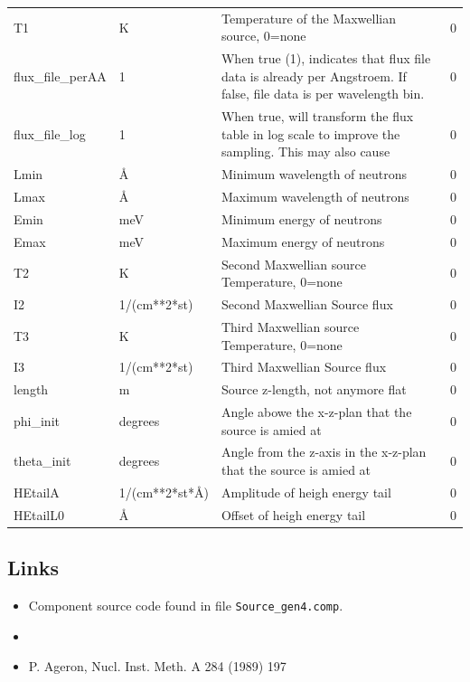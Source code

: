 \begin{longtable}{p{}p{}p{}p{}}
T1 & K & Temperature of the Maxwellian source, 0=none & 0 \\
flux\_file\_perAA & 1 & When true (1), indicates that flux file data is already per Angstroem. If false, file data is per wavelength bin. & 0 \\
flux\_file\_log & 1 & When true, will transform the flux table in log scale to improve the sampling. This may also cause & 0 \\
Lmin & \AA{} & Minimum wavelength of neutrons & 0 \\
Lmax & \AA{} & Maximum wavelength of neutrons & 0 \\
Emin & meV & Minimum energy of neutrons & 0 \\
Emax & meV & Maximum energy of neutrons & 0 \\
T2 & K & Second Maxwellian source Temperature, 0=none & 0 \\
I2 & 1/(cm**2*st) & Second Maxwellian Source flux & 0 \\
T3 & K & Third Maxwellian source Temperature, 0=none & 0 \\
I3 & 1/(cm**2*st) & Third Maxwellian Source flux & 0 \\
length & m & Source z-length, not anymore flat & 0 \\
phi\_init & degrees & Angle abowe the x-z-plan that the source is amied at & 0 \\
theta\_init & degrees & Angle from the z-axis in the x-z-plan that the source is amied at & 0 \\
HEtailA & 1/(cm**2*st*\AA{}) & Amplitude of heigh energy tail & 0 \\
HEtailL0 & \AA{} & Offset of heigh energy tail & 0 \\
\bottomrule
\end{longtable}

\subsection*{Links}
\begin{itemize}
  \item Component source code found in file \texttt{Source\_gen4.comp}.
  \item {}
  \item P. Ageron, Nucl. Inst. Meth. A 284 (1989) 197
\end{itemize}
